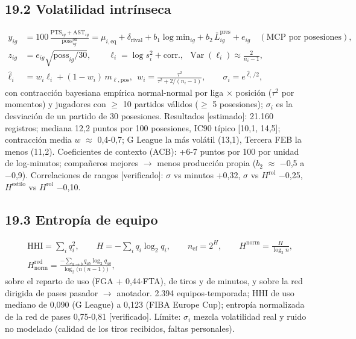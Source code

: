 \documentclass[10pt,a4paper]{article}
\begin{document}
\subsection*{19.2 Volatilidad intrínseca}
\[
\begin{aligned} y_{ig} &= 100\,\frac{\mathrm{PTS}_{ig} + \mathrm{AST}_{ig}}{\mathrm{poss}^{\mathrm{on}}_{ig}} = \mu_{i,\mathrm{eq}} + \delta_{\mathrm{rival}} + b_1 \log \mathrm{min}_{ig} + b_2\,\bar L^{\mathrm{pres}}_{ig} + e_{ig}\quad(\text{MCP por posesiones}),\\ z_{ig} &= e_{ig}\sqrt{\mathrm{poss}_{ig}/30}, \qquad \ell_i = \log s_i^2 + \text{corr.},\ \ \operatorname{Var}(\ell_i) \approx \frac{2}{n_i - 1},\\ \hat\ell_i &= w_i \ell_i + (1-w_i)\, m_{\ell,\mathrm{pos}},\ \ w_i = \frac{\tau^2}{\tau^2 + 2/(n_i-1)}, \qquad \sigma_i = e^{\hat\ell_i/2} , \end{aligned}
\]
con contracción bayesiana empírica normal-normal por liga \ensuremath{\times} posición ($\tau^2$ por momentos) y jugadores con \ensuremath{\geq} 10 partidos válidos (\ensuremath{\geq} 5 posesiones); $\sigma_i$ es la desviación de un partido de 30 posesiones. Resultados [estimado]: 21.160 registros; mediana 12,2 puntos por 100 posesiones, IC90 típico [10,1, 14,5]; contracción media $w$ \ensuremath{\approx} 0,4-0,7; G League la más volátil (13,1), Tercera FEB la menos (11,2). Coeficientes de contexto (ACB): +6-7 puntos por 100 por unidad de log-minutos; compañeros mejores \ensuremath{\to} menos producción propia ($b_2$ \ensuremath{\approx} \ensuremath{-}0,5 a \ensuremath{-}0,9). Correlaciones de rangos [verificado]: \ensuremath{\sigma} vs minutos +0,32, \ensuremath{\sigma} vs $H^{\mathrm{rol}}$ \ensuremath{-}0,25, $H^{\mathrm{estilo}}$ vs $H^{\mathrm{rol}}$ \ensuremath{-}0,10.

\subsection*{19.3 Entropía de equipo}
\[
\begin{aligned} &\mathrm{HHI} = \sum_i q_i^2, \qquad H = -\sum_i q_i \log_2 q_i, \qquad n_{\mathrm{ef}} = 2^{H}, \qquad H^{\mathrm{norm}} = \frac{H}{\log_2 n},\\ &H^{\mathrm{red}}_{\mathrm{norm}} = \frac{-\sum_{a \to b} q_{ab}\log_2 q_{ab}}{\log_2\big(n(n-1)\big)} , \end{aligned}
\]
sobre el reparto de uso (FGA + 0,44\ensuremath{\cdot}FTA), de tiros y de minutos, y sobre la red dirigida de pases pasador \ensuremath{\to} anotador. 2.394 equipos-temporada; HHI de uso mediano de 0,090 (G League) a 0,123 (FIBA Europe Cup); entropía normalizada de la red de pases 0,75-0,81 [verificado]. Límite: $\sigma_i$ mezcla volatilidad real y ruido no modelado (calidad de los tiros recibidos, faltas personales).
\end{document}
